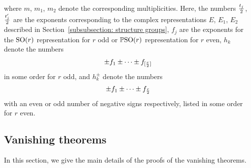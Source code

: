 \documentclass[pdftex]{sigma}
\numberwithin{equation}{section}
\begin{document}
where $m$, $m_1$, $m_2$ denote the corresponding multiplicities. Here, the numbers ${t_j\over 2}$, ${t_j'\over 2}$ are the exponents corresponding to the complex representations $E$, $E_1$, $E_2$ described in Section~\ref{subsubsection: structure groups}, $f_j$ are the exponents for the ${\rm SO}(r)$ representation for $r$ odd or $\mathbb{P}{\rm SO}(r)$ representation for $r$ even, $h_k$ denote the numbers
\begin{gather*} \pm f_1\pm\cdots \pm f_{[{r\over 2}]}\end{gather*}
in some order for $r$ odd, and $h_k^\pm$ denote the numbers
\begin{gather*} \pm f_1\pm\cdots \pm f_{r\over 2}\end{gather*}
with an even or odd number of negative signs respectively, listed in some order for $r$ even.

\subsection{Vanishing theorems}

In this section, we give the main details of the proofs of the vanishing theorems.
\end{document}
